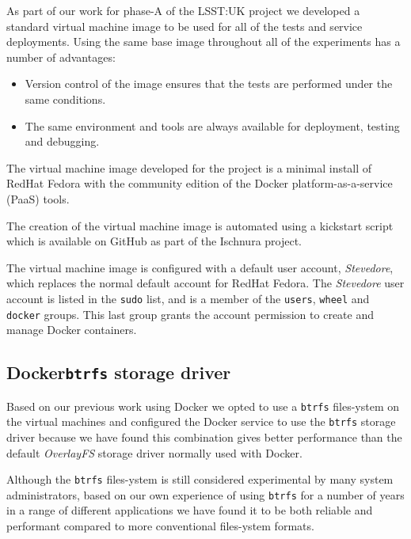 \documentclass{article}
\newcommand{\docker} {Docker\xspace}
\newcommand{\ischnura} {Ischnura\xspace}
\newcommand{\kickstart} {kickstart\xspace}
\newcommand{\stevedore} {\textit{Stevedore}\xspace}
\newcommand{\btrfs} {\texttt{btrfs}\xspace}
\newcommand{\filesystem} {files-ystem\xspace}
\newcommand{\paas} {PaaS\xspace}
\newcommand{\redhat} {RedHat\xspace}
\newcommand{\fedora} {Fedora\xspace}
\newcommand{\github} {GitHub\xspace}
\newcommand{\phasea} {phase-A\xspace}
\newcommand{\lsstuk} {LSST:UK\xspace}
\begin{document}
As part of our work for \phasea of the \lsstuk project we developed a standard virtual machine image to be used for all of the tests and service deployments. Using the same base image throughout all of the experiments has a number of advantages:
\begin{itemize}
    \item Version control of the image ensures that the tests are performed under the same conditions.
    \item The same environment and tools are always available for deployment, testing and debugging.
\end{itemize}

The virtual machine image developed for the project is a minimal install of \redhat \fedora with the community edition of the \docker platform-as-a-service (\paas) tools.

The creation of the virtual machine image is automated using a \kickstart script which is available on \github as part of the \ischnura project.


The virtual machine image is configured with a default user account, \stevedore, which replaces the normal default account for \redhat \fedora.
The \stevedore user account is listed in the \texttt{sudo} list, and is a member of the \texttt{users}, \texttt{wheel} and \texttt{docker} groups. This last group grants the account permission to create and manage \docker containers.

\subsection{\docker \btrfs storage driver}
\label{docker.btrfs.}

Based on our previous work using \docker
we opted to use a  \btrfs \filesystem on the virtual machines and configured the \docker service to use the \btrfs storage driver because we have found this combination gives better performance than the default \textit{OverlayFS} storage driver normally used with \docker.

Although the \btrfs \filesystem is still considered experimental by many system administrators, based on our own experience of using \btrfs for a number of years in a range of different applications we have found it to be both reliable and performant compared to more conventional \filesystem formats.
\end{document}

